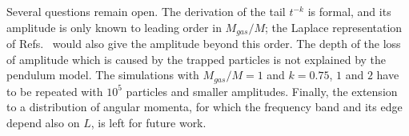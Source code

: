 Several questions remain open. The derivation of the tail $t^{-k}$ is formal, and its amplitude is only known to leading order in $M_{gas}/M$; the Laplace representation of Refs.~\cite{jBaOyY11,jByY13} would also give the amplitude beyond this order. The depth of the loss of amplitude which is caused by the trapped particles is not explained by the pendulum model. The simulations with $M_{gas}/M = 1$ and $k = 0.75$, $1$ and $2$ have to be repeated with $10^5$ particles and smaller amplitudes. Finally, the extension to a distribution of angular momenta, for which the frequency band and its edge depend also on $L$, is left for future work. 
